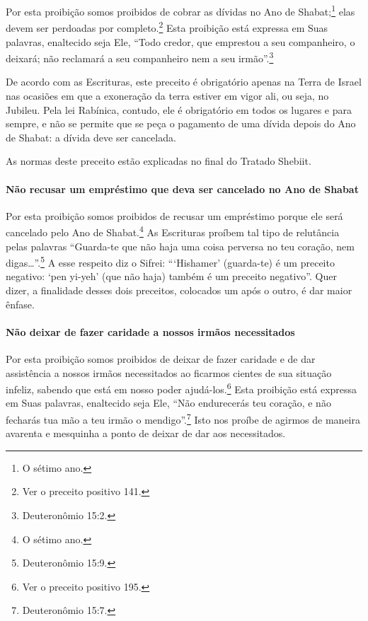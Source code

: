 Por esta proibição somos proibidos de cobrar as dívidas no Ano de
Shabat;\footnote{O sétimo ano.} elas devem ser perdoadas por
completo.\footnote{Ver o preceito positivo 141.} Esta proibição está expressa em Suas
palavras, enaltecido seja Ele, ``Todo credor, que emprestou a seu
companheiro, o deixará; não reclamará a seu companheiro nem a seu
irmão''.\footnote{Deuteronômio 15:2.}

De acordo com as Escrituras, este preceito é obrigatório apenas na Terra
de Israel nas ocasiões em que a exoneração da terra estiver em vigor
ali, ou seja, no Jubileu. Pela lei Rabínica, contudo, ele é obrigatório
em todos os lugares e para sempre, e não se permite que se peça o
pagamento de uma dívida depois do Ano de Shabat: a dívida deve ser
cancelada.

As normas deste preceito estão explicadas no final do Tratado Shebiit.

\paragraph{Não recusar um empréstimo que deva ser cancelado no Ano de Shabat}

Por esta proibição somos proibidos de recusar um empréstimo porque ele
será cancelado pelo Ano de Shabat.\footnote{O sétimo ano.} As Escrituras
proíbem tal tipo de relutância pelas palavras ``Guarda-te que não haja
uma coisa perversa no teu coração, nem digas\ldots{}''.\footnote{Deuteronômio 15:9.} A
esse respeito diz o Sifrei: ```Hishamer' (guarda-te) é um preceito
negativo: `pen yi-yeh' (que não haja) também é um preceito negativo''.
Quer dizer, a finalidade desses dois preceitos, colocados um após o
outro, é dar maior ênfase.

\paragraph{Não deixar de fazer caridade a nossos irmãos necessitados}

Por esta proibição somos proibidos de deixar de fazer caridade e de dar
assistência a nossos irmãos necessitados ao ficarmos cientes de sua
situação infeliz, sabendo que está em nosso poder
ajudá-los.\footnote{Ver o preceito positivo 195.} Esta proibição está expressa em Suas
palavras, enaltecido seja Ele, ``Não endurecerás teu coração, e não
fecharás tua mão a teu irmão o mendigo''.\footnote{Deuteronômio 15:7.} Isto nos
proíbe de agirmos de maneira avarenta e mesquinha a ponto de deixar de
dar aos necessitados.


